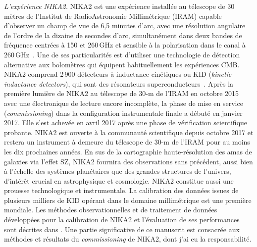 \emph{L'expérience NIKA2.} NIKA2 est une expérience installée au
télescope de 30 mètres de l'Institut de RadioAstronomie Millimétrique
(IRAM) capable d'observer un champ de vue de 6,5 minutes d'arc, avec
une résolution angulaire de l'ordre de la dizaine de secondes d'arc,
simultanément dans deux bandes de fréquence centrées à 150 et
260\,GHz et sensible à la polarisation dans le canal à
260\,GHz~. Une de ses particularités est
d'utiliser une technologie de détection alternative aux bolomètres qui
équipent habituellement les expériences CMB. NIKA2 comprend 2\,900
détecteurs à inductance cinétiques ou KID (\emph{kinetic inductance
detectors}), qui sont des résonateurs
superconducteurs~. Après la première lumière de NIKA2 au
télescope de 30-m de l'IRAM en octobre 2015 avec une électronique de
lecture encore incomplète, la phase de mise en service
(\emph{commissioning}) dans la configuration instrumentale finale a
débuté en janvier 2017. Elle s'est achevée en avril 2017 après une
phase de vérification scientifique probante. NIKA2 est ouverte à la
communauté scientifique depuis octobre 2017 et restera un instrument à
demeure du télescope de 30-m de l'IRAM pour au moins les dix
prochaines années. En sus de la cartographie haute-résolution des amas
de galaxies via l'effet SZ, NIKA2 fournira des observations sans
précédent, aussi bien à l'échelle des systèmes planétaires que des
grandes structures de l'univers, d'intérêt crucial en astrophysique et
cosmologie. NIKA2 constitue aussi une prouesse technologique et
instrumentale. La calibration des données issues de plusieurs milliers
de KID opérant dans le domaine millimétrique est une première
mondiale. Les méthodes observationnelles et de traitement de données
développées pour la calibration de NIKA2 et l'évaluation de ses
performances sont décrites dans . Une partie
significative de ce manuscrit est consacrée aux méthodes et résultats
du \emph{commissioning} de NIKA2, dont j'ai eu la responsabilité.\\ 




